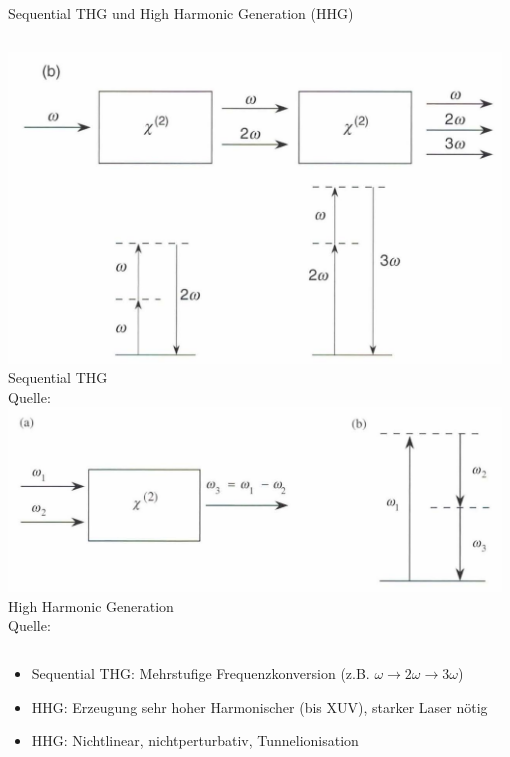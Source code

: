 \documentclass[notes=only]{beamer}
\newcommand{\figcite}[1]{\\[-3mm]{\tiny Quelle: \cite{#1}}}
\begin{document}

\begin{frame}{Sequential THG und High Harmonic Generation (HHG)}
  \begin{columns}[T,onlytextwidth]
      \includegraphics[width=0.98\textwidth]{Images/seq_thg.png}\\[-1mm]{\tiny Sequential THG \figcite{Boyd2020}}
      \includegraphics[width=0.98\textwidth]{Images/hhg.png}\\[-1mm]{\tiny High Harmonic Generation \figcite{Boyd2020}}
  \end{columns}
  \vspace{0.2cm}
  \begin{itemize}
    \item Sequential THG: Mehrstufige Frequenzkonversion (z.B. $\omega \rightarrow 2\omega \rightarrow 3\omega$)
    \item HHG: Erzeugung sehr hoher Harmonischer (bis XUV), starker Laser nötig
    \item HHG: Nichtlinear, nichtperturbativ, Tunnelionisation
  \end{itemize}
\end{frame}
\end{document}
